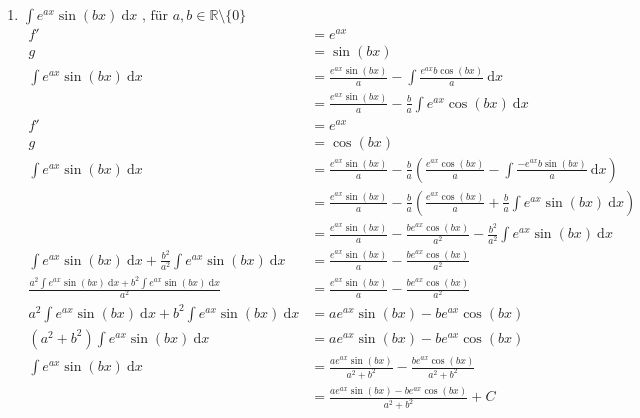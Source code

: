 \documentclass[10pt]{article}
\begin{document}
\begin{enumerate}[start=5,leftmargin=1in]
\begin{enumerate}
        \item $\int e^{ax} \sin(bx) \: \text{d}x \text{ , für } a,b \in \mathbb{R} \setminus \{0\}$
        \begin{align*}
            f' &= e^{ax} \\
            g &= \sin(bx) \\
            \int e^{ax} \sin(bx) \: \text{d}x &= \frac{e^{ax} \sin(bx)}{a} - \int \frac{e^{ax} b \cos(bx)}{a} \: \text{d}x \\
            &= \frac{e^{ax} \sin(bx)}{a} - \frac{b}{a} \int e^{ax} \cos(bx) \: \text{d}x \\
            f' &= e^{ax} \\
            g &= \cos(bx) \\
            \int e^{ax} \sin(bx) \: \text{d}x &= \frac{e^{ax} \sin(bx)}{a} - \frac{b}{a} \left(\frac{e^{ax} \cos(bx)}{a} - \int \frac{-e^{ax} b \sin(bx)}{a} \: \text{d}x\right) \\
            &= \frac{e^{ax} \sin(bx)}{a} - \frac{b}{a} \left(\frac{e^{ax} \cos(bx)}{a} + \frac{b}{a} \int e^{ax} \sin(bx) \: \text{d}x\right) \\
            &= \frac{e^{ax} \sin(bx)}{a} - \frac{be^{ax} \cos(bx)}{a^2} - \frac{b^2}{a^2} \int e^{ax} \sin(bx) \: \text{d}x \\
            \int e^{ax} \sin(bx) \: \text{d}x + \frac{b^2}{a^2} \int e^{ax} \sin(bx) \: \text{d}x &= \frac{e^{ax} \sin(bx)}{a} - \frac{be^{ax} \cos(bx)}{a^2} \\
            \frac{a^{2} \int e^{ax} \sin(bx) \: \text{d}x + b^{2} \int e^{ax} \sin(bx) \: \text{d}x}{a^2} &= \frac{e^{ax} \sin(bx)}{a} - \frac{be^{ax} \cos(bx)}{a^2} \\
            a^{2} \int e^{ax} \sin(bx) \: \text{d}x + b^{2} \int e^{ax} \sin(bx) \: \text{d}x &= a e^{ax} \sin(bx) - be^{ax} \cos(bx) \\
            (a^{2} + b^{2}) \int e^{ax} \sin(bx) \: \text{d}x &= a e^{ax} \sin(bx) - be^{ax} \cos(bx) \\
            \int e^{ax} \sin(bx) \: \text{d}x &= \frac{a e^{ax} \sin(bx)}{a^{2} + b^{2}} - \frac{be^{ax} \cos(bx)}{a^{2} + b^{2}} \\
            &= \frac{a e^{ax} \sin(bx) - be^{ax} \cos(bx)}{a^{2} + b^{2}} + C
        \end{align*}


\end{enumerate}
\end{enumerate}
\end{document}
